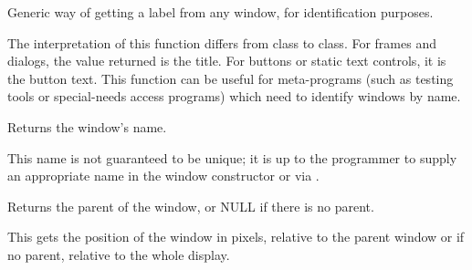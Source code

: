 

Generic way of getting a label from any window, for
identification purposes.


The interpretation of this function differs from class to class.
For frames and dialogs, the value returned is the title. For buttons or static text controls, it is
the button text. This function can be useful for meta-programs (such as testing
tools or special-needs access programs) which need to identify windows
by name.

\label{wxwindowgetname}


Returns the window's name.


This name is not guaranteed to be unique; it is up to the programmer to supply an appropriate
name in the window constructor or via .





Returns the parent of the window, or NULL if there is no parent.

\label{wxwindowgetposition}



This gets the position of the window in pixels, relative to the parent window or
if no parent, relative to the whole display.





